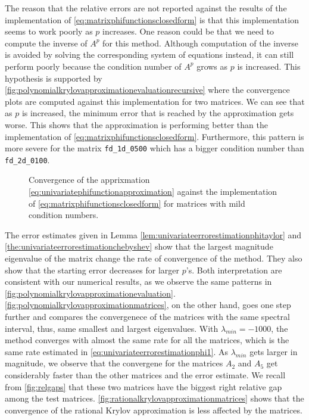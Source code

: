 \begin{remark}
    The reason that the relative errors are not reported against the results of the implementation of
    \eqref{eq:matrixphifunctionsclosedform} is that this implementation seems to work poorly as $p$ increases.
    One reason could be that we need to compute the inverse of $A^p$ for this method. Although computation of the
    inverse is avoided by solving the corresponding system of equations instead, it can still perform poorly because
    the condition number of $A^p$ grows as $p$ is increased. This hypothesis is supported by
    \autoref{fig:polynomialkrylovapproximationevaluationrecursive} where the convergence plots are computed against this implementation
    for two matrices. We can see that as $p$ is increased, the minimum error that is reached by the approximation gets worse.
    This shows that the approximation is performing better than the implementation of \eqref{eq:matrixphifunctionsclosedform}.
    Furthermore, this pattern is more severe for the matrix \texttt{fd\_1d\_0500} which has a bigger condition number
    than \texttt{fd\_2d\_0100}.
\end{remark}

\begin{figure}[h!]
    \centering
    \caption{Convergence of the apprixmation \eqref{eq:univariatephifunctionapproximation} against
    the implementation of \eqref{eq:matrixphifunctionsclosedform} for matrices with mild condition numbers.}
    \label{fig:polynomialkrylovapproximationevaluationrecursive}
\end{figure}

The error estimates given in Lemma \ref{lem:univariateerrorestimationphitaylor} and \autoref{the:univariateerrorestimationchebyshev}
show that the largest magnitude eigenvalue of the matrix change the rate of convergence of the method. They also show that the starting error
decreases for larger $p$'s. Both interpretation are consistent with our numerical results, as we observe the same patterns in
\autoref{fig:polynomialkrylovapproximationevaluation}. \autoref{fig:polynomialkrylovapproximationmatrices}, on the other hand, goes
one step further and compares the convergenece of the matrices with the same spectral interval, thus, same smallest and largest eigenvalues.
With $\lambda_{min} = -1000$, the method converges with almost the same rate for all the matrices, which is the same rate estimated in
\eqref{eq:univariateerrorestimationphi1}. As $\lambda_{min}$ gets larger in magnitude, we observe that the convergene for the matrices
$A_2$ and $A_5$ get considerably faster than the other matrices and the error estimate. We recall from \autoref{fig:relgaps} that these
two matrices have the biggest right relative gap among the test matrices. \autoref{fig:rationalkrylovapproximationmatrices} shows that
the convergence of the rational Krylov approximation is less affected by the matrices.


